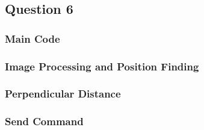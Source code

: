 	\subsection{Question 6}
	\subsubsection{Main Code}
	
	\pagebreak
	\subsubsection{Image Processing and Position Finding}
	
	\pagebreak
	\subsubsection{Perpendicular Distance}
	
	\pagebreak
	\subsubsection{Send Command}
	
	
	\pagebreak
		